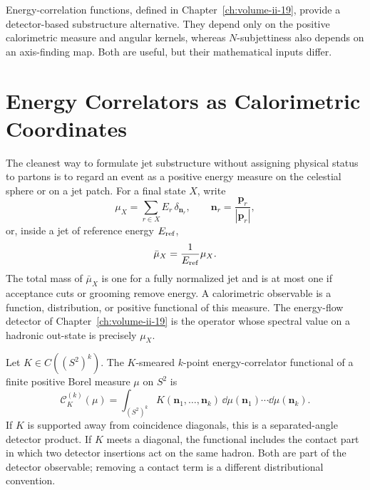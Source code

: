 Energy-correlation functions, defined in
Chapter~\ref{ch:volume-ii-19}, provide a detector-based substructure
alternative.  They depend only on the positive calorimetric measure and
angular kernels, whereas \(N\)-subjettiness also depends on an axis-finding
map.  Both are useful, but their mathematical inputs differ.

\section{Energy Correlators as Calorimetric Coordinates}
\label{sec:energy-correlators-calorimetric-coordinates}

The cleanest way to formulate jet substructure without assigning physical
status to partons is to regard an event as a positive energy measure on the
celestial sphere or on a jet patch.  For a final state \(X\), write
\[
  \mu_X=\sum_{r\in X}E_r\,\delta_{\mathbf n_r},
  \qquad
  \mathbf n_r=\frac{\mathbf p_r}{|\mathbf p_r|},
\]
or, inside a jet of reference energy \(E_{\rm ref}\),
\[
  \bar\mu_X=\frac{1}{E_{\rm ref}}\mu_X .
\]
The total mass of \(\bar\mu_X\) is one for a fully normalized jet and is at
most one if acceptance cuts or grooming remove energy.  A calorimetric
observable is a function, distribution, or positive functional of this
measure.  The energy-flow detector of
Chapter~\ref{ch:volume-ii-19} is the operator whose spectral value on a
hadronic out-state is precisely \(\mu_X\).

\begin{definition}
\label{def:smeared-energy-correlator-functional}
Let \(K\in C((S^2)^k)\).  The \(K\)-smeared \(k\)-point energy-correlator
functional of a finite positive Borel measure \(\mu\) on \(S^2\) is
\begin{equation}
  \mathcal C_K^{(k)}(\mu)
  =
  \int_{(S^2)^k}
  K(\mathbf n_1,\ldots,\mathbf n_k)\,
  \dd\mu(\mathbf n_1)\cdots\dd\mu(\mathbf n_k).
  \label{eq:smeared-energy-correlator-functional}
\end{equation}
If \(K\) is supported away from coincidence diagonals, this is a
separated-angle detector product.  If \(K\) meets a diagonal, the functional
includes the contact part in which two detector insertions act on the same
hadron.  Both are part of the detector observable; removing a contact term is
a different distributional convention.
\end{definition}

